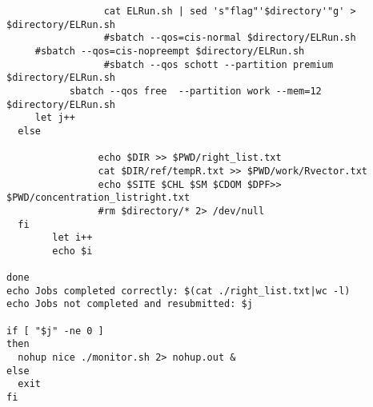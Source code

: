 \begin{appendices}
\begin{lstlisting}
                 cat ELRun.sh | sed 's"flag"'$directory'"g' > $directory/ELRun.sh
                 #sbatch --qos=cis-normal $directory/ELRun.sh
     #sbatch --qos=cis-nopreempt $directory/ELRun.sh
                 #sbatch --qos schott --partition premium $directory/ELRun.sh
           sbatch --qos free  --partition work --mem=12 $directory/ELRun.sh
     let j++
  else

                echo $DIR >> $PWD/right_list.txt
                cat $DIR/ref/tempR.txt >> $PWD/work/Rvector.txt
                echo $SITE $CHL $SM $CDOM $DPF>> $PWD/concentration_listright.txt
                #rm $directory/* 2> /dev/null
  fi
        let i++
        echo $i

done
echo Jobs completed correctly: $(cat ./right_list.txt|wc -l)
echo Jobs not completed and resubmitted: $j

if [ "$j" -ne 0 ]
then
  nohup nice ./monitor.sh 2> nohup.out &
else
  exit
fi


\end{lstlisting}






\end{appendices}